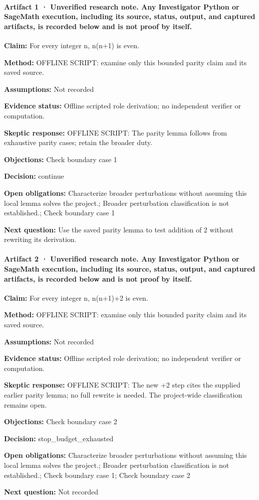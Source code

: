 \documentclass[11pt]{article}
\begin{document}
\paragraph{Artifact 1 · Unverified research note. Any Investigator Python or SageMath execution, including its source, status, output, and captured artifacts, is recorded below and is not proof by itself.}
\textbf{Claim:} For every integer n, n(n+1) is even.\par
\textbf{Method:} OFFLINE SCRIPT: examine only this bounded parity claim and its saved source.\par
\textbf{Assumptions:} Not recorded\par
\textbf{Evidence status:} Offline scripted role derivation; no independent verifier or computation.\par
\textbf{Skeptic response:} OFFLINE SCRIPT: The parity lemma follows from exhaustive parity cases; retain the broader duty.\par
\textbf{Objections:} Check boundary case 1\par
\textbf{Decision:} continue\par
\textbf{Open obligations:} Characterize broader perturbations without assuming this local lemma solves the project.; Broader perturbation classification is not established.; Check boundary case 1\par
\textbf{Next question:} Use the saved parity lemma to test addition of 2 without rewriting its derivation.\par
\paragraph{Artifact 2 · Unverified research note. Any Investigator Python or SageMath execution, including its source, status, output, and captured artifacts, is recorded below and is not proof by itself.}
\textbf{Claim:} For every integer n, n(n+1)+2 is even.\par
\textbf{Method:} OFFLINE SCRIPT: examine only this bounded parity claim and its saved source.\par
\textbf{Assumptions:} Not recorded\par
\textbf{Evidence status:} Offline scripted role derivation; no independent verifier or computation.\par
\textbf{Skeptic response:} OFFLINE SCRIPT: The new +2 step cites the supplied earlier parity lemma; no full rewrite is needed. The project-wide classification remains open.\par
\textbf{Objections:} Check boundary case 2\par
\textbf{Decision:} stop\_budget\_exhausted\par
\textbf{Open obligations:} Characterize broader perturbations without assuming this local lemma solves the project.; Broader perturbation classification is not established.; Check boundary case 1; Check boundary case 2\par
\textbf{Next question:} Not recorded\par
\end{document}
